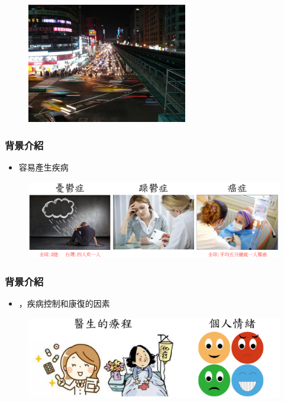\documentclass[10pt, conference, compsocconf]{beamer}
\begin{document}
\begin{CJK}{UTF8}{}
\begin{frame}
\begin{figure}[!t]
\begin{center}
\includegraphics[width=7cm]{./Figures/0.jpg}
\end{center}
\end{figure}

\end{frame}

\begin{frame}
\frametitle{背景介紹}

\begin{itemize}
\item \Large 容易產生疾病  
\end{itemize}
\vspace{5mm}
\begin{figure}[!t]
\begin{center}
\includegraphics[width=12cm]{./Figures/fig_disease.pdf}
\end{center}
\label{fig:device}
\end{figure}

\end{frame}


\begin{frame}
\frametitle{背景介紹}

\begin{itemize}
\item {}，疾病控制和康復的因素
\end{itemize}
\vspace{5mm}
\begin{figure}[!t]
\begin{center}
\includegraphics[width=11.5cm]{./Figures/fig_doctor.pdf}
\end{center}
\end{figure}


\end{frame}
\end{CJK}
\end{document}
